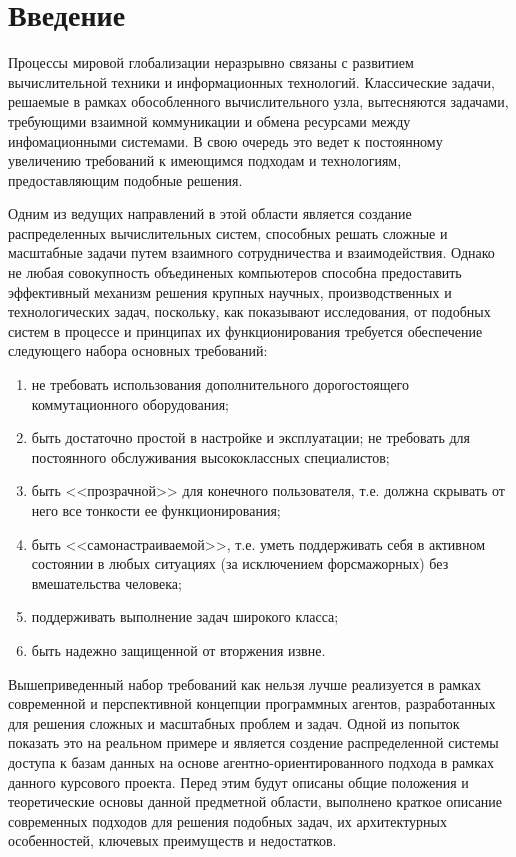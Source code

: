 \section*{Введение}
Процессы мировой глобализации неразрывно связаны с развитием вычислительной техники и информационных технологий. Классические задачи, решаемые в рамках обособленного вычислительного узла, вытесняются задачами, требующими взаимной коммуникации и обмена ресурсами между инфомационными системами. В свою очередь это ведет к постоянному увеличению требований к имеющимся подходам и технологиям, предоставляющим подобные решения.

Одним из ведущих направлений в этой области является создание распределенных вычислительных систем, способных решать сложные и масштабные задачи путем взаимного сотрудничества и взаимодействия. Однако не любая совокупность объединеных компьютеров способна предоставить эффективный механизм решения крупных научных, производственных и технологических задач, поскольку, как показывают исследования, от подобных систем в процессе и принципах их функционирования требуется обеспечение следующего набора основных требований:

\begin{enumerate}
\item не требовать использования дополнительного дорогостоящего коммутационного оборудования;
\item быть достаточно простой в настройке и эксплуатации; не требовать для постоянного обслуживания высококлассных специалистов;
\item быть <<прозрачной>> для конечного пользователя, т.е. должна скрывать от него все тонкости ее функционирования;
\item быть <<самонастраиваемой>>, т.е. уметь поддерживать себя в активном состоянии в любых ситуациях (за исключением форсмажорных) без вмешательства человека;
\item поддерживать выполнение задач широкого класса;
\item быть надежно защищенной от вторжения извне.
\end{enumerate}

Вышеприведенный набор требований как нельзя лучше реализуется в рамках современной и перспективной концепции программных агентов, разработанных для решения сложных и масштабных проблем и задач. Одной из попыток показать это на реальном примере и является создение распределенной системы доступа к базам данных на основе агентно-ориентированного подхода в рамках данного курсового проекта. Перед этим будут описаны общие положения и теоретические основы данной предметной области, выполнено краткое описание современных подходов для решения подобных задач, их архитектурных особенностей, ключевых преимуществ и недостатков.

